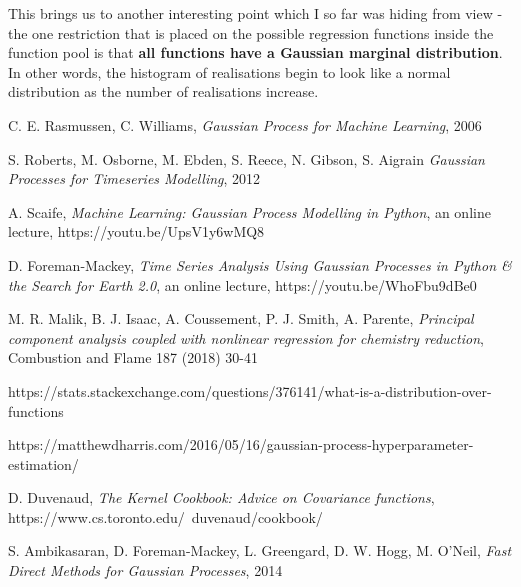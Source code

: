 \documentclass[10pt,twocolumn]{article}
\begin{document}
This brings us to another interesting point which I so far was hiding from view - the one restriction that is placed on the possible regression functions inside the function pool is that \textbf{all functions have a Gaussian marginal distribution}.
In other words, the histogram of realisations begin to look like a normal distribution as the number of realisations increase.















\thebibliography{}

 C. E. Rasmussen, C. Williams, \textit{Gaussian Process for Machine Learning}, 2006

 S. Roberts, M. Osborne, M. Ebden, S. Reece, N. Gibson, S. Aigrain \textit{Gaussian Processes for Timeseries Modelling}, 2012

 A. Scaife, \textit{Machine Learning: Gaussian Process Modelling in Python}, an online lecture, https://youtu.be/UpsV1y6wMQ8

 D. Foreman-Mackey, \textit{Time Series Analysis Using Gaussian Processes in Python \& the Search for Earth 2.0}, an online lecture, https://youtu.be/WhoFbu9dBe0

 M. R. Malik, B. J. Isaac, A. Coussement, P. J. Smith, A. Parente, \textit{Principal component analysis coupled with nonlinear regression for chemistry reduction}, Combustion and Flame 187 (2018) 30-41

 https://stats.stackexchange.com/questions/376141/what-is-a-distribution-over-functions

\bibitem{} https://matthewdharris.com/2016/05/16/gaussian-process-hyperparameter-estimation/

 D. Duvenaud, \textit{The Kernel Cookbook: Advice on Covariance functions}, https://www.cs.toronto.edu/~duvenaud/cookbook/

 S. Ambikasaran, D. Foreman-Mackey, L. Greengard, D. W. Hogg, M. O'Neil, \textit{Fast Direct Methods for Gaussian Processes}, 2014
\end{document}
